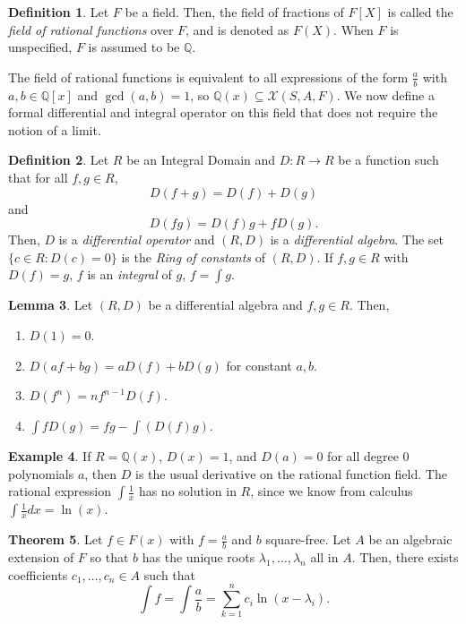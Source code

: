 \documentclass{article}
\theoremstyle{definition}
\newtheorem{thm}{Theorem}[section]
\newtheorem{lemma}[thm]{Lemma}
\newtheorem{defin}[thm]{Definition}
\newtheorem{exa}[thm]{Example}
\begin{document}
\begin{defin}
    Let $F$ be a field. Then, the field of fractions of $F[X]$ is called the \emph{field of rational functions} over $F$, and is denoted as $F(X)$. When $F$ is unspecified, $F$ is assumed to be $\mathbb{Q}$. 
\end{defin}

The field of rational functions is equivalent to all expressions of the form $\frac{a}{b}$ with $a, b \in \mathbb{Q}[x]$ and $\gcd(a, b) = 1$, so $\mathbb{Q}(x) \subseteq \mathcal{X}(S, A, F)$. We now define a formal differential and integral operator on this field that does not require the notion of a limit. \cite{mca}

\begin{defin} \label{def8}
    Let $R$ be an Integral Domain and $D:R\to R$ be a function such that for all $f, g \in R$, \[D(f+g) = D(f)+D(g)\] and \[ D(fg) = D(f)g+fD(g).\] Then, $D$ is a \emph{differential operator} and $(R,D)$ is a \emph{differential algebra}. The set $\{c \in R : D(c) = 0\}$ is the \emph{Ring of constants} of $(R,D)$. If $f, g \in R$ with $D(f) = g$, $f$ is an \emph{integral} of $g$, $f = \int g$.
\end{defin}

\begin{lemma}
    Let $(R, D)$ be a differential algebra and $f, g \in R$. Then,
    \begin{enumerate}
        \item $D(1)=0$.
        \item $D(af+bg) = aD(f)+bD(g)$ for constant $a, b$.
        \item $D(f^n) = nf^{n-1}D(f)$.
        \item $\int f D(g) = fg - \int(D(f)g)$.
    \end{enumerate}
\end{lemma}

\begin{exa}
    If $R = \mathbb{Q}(x)$, $D(x) = 1$, and $D(a) = 0$ for all degree 0 polynomials $a$, then $D$ is the usual derivative on the rational function field. The rational expression $\int \frac{1}{x}$ has no solution in $R$, since we know from calculus $\int \frac{1}{x} dx = \ln(x)$.
\end{exa}

\begin{thm}
    Let $f \in F(x)$ with $f=\frac{a}{b}$ and $b$ square-free. Let $A$ be an algebraic extension of $F$ so that $b$ has the unique roots $\lambda_1, \ldots, \lambda_n$ all in $A$. Then, there exists coefficients $c_1, \ldots, c_n \in A$ such that \[ \int f = \int \frac{a}{b} = \sum_{k=1}^{n} c_i \ln(x - \lambda_i).\] 
\end{thm}
\end{document}
